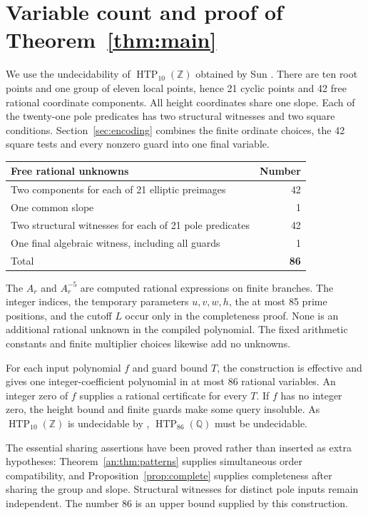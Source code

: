 \documentclass[11pt,reqno]{amsart}
\theoremstyle{definition}
\numberwithin{equation}{section}
\newcommand{\Q}{\mathbb Q}
\newcommand{\Z}{\mathbb Z}
\newcommand{\HTP}{\operatorname{HTP}}
\begin{document}
\section{Variable count and proof of Theorem~\ref{thm:main}}\label{sec:count}
We use the undecidability of $\HTP_{10}(\Z)$ obtained by Sun \cite{Sun10}.
There are ten root points and one group of eleven local points, hence 21 cyclic points and 42 free rational coordinate components. All height coordinates share one slope. Each of the twenty-one pole predicates has two structural witnesses and two square conditions. Section~\ref{sec:encoding} combines the finite ordinate choices, the 42 square tests and every nonzero guard into one final variable. 
\begin{center}
\begin{tabular}{@{}p{4.25in}r@{}}
\toprule
Free rational unknowns & Number\\\midrule
Two components for each of 21 elliptic preimages &42\\
One common slope &1\\
Two structural witnesses for each of 21 pole predicates &42\\
One final algebraic witness, including all guards &1\\\midrule
Total &\textbf{86}\\\bottomrule
\end{tabular}
\end{center}
The $A_r$ and $A_r^{-5}$ are computed rational expressions on finite branches. The integer indices, the temporary parameters $u,v,w,h$, the at most 85 prime positions, and the cutoff $L$ occur only in the completeness proof. None is an additional rational unknown in the compiled polynomial. The fixed arithmetic constants and finite multiplier choices likewise add no unknowns.

For each input polynomial $f$ and guard bound $T$, the construction is effective and gives one integer-coefficient polynomial in at most 86 rational variables. An integer zero of $f$ supplies a rational certificate for every $T$. If $f$ has no integer zero, the height bound and finite guards make some query insoluble.  As $\HTP_{10}(\Z)$ is undecidable by  \cite[Corollary 1.1]{Sun10},
$\HTP_{86}(\Q)$ must be undecidable.

The essential sharing assertions have been proved rather than inserted as extra hypotheses: Theorem~\ref{an:thm:patterns} supplies simultaneous order compatibility, and Proposition~\ref{prop:complete} supplies completeness after sharing the group and slope. Structural witnesses for distinct pole inputs remain independent. The number 86 is an upper bound supplied by this construction.
\end{document}
